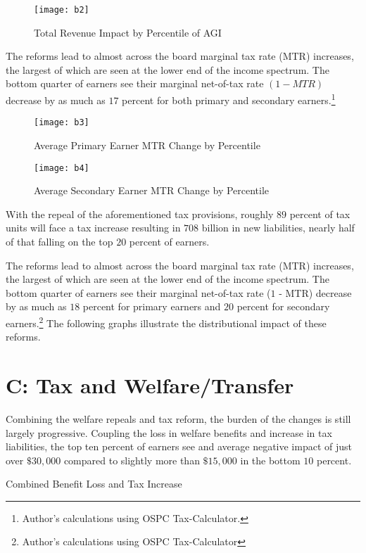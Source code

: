 \documentclass{article}
\begin{document}
\begin{figure}[H]
\centering
\caption{Total Revenue Impact by Percentile of AGI}
\texttt{[image: b2]}
\end{figure}

The reforms lead to almost across the board marginal tax rate (MTR) increases, the largest of which are seen at the lower end of the income spectrum. The bottom quarter of earners see their marginal net-of-tax rate $(1 - MTR)$ decrease by as much as $17$ percent for both primary and secondary earners.\footnote{Author’s calculations using OSPC Tax-Calculator.}


\begin{figure}[H]
\centering
\caption{Average Primary Earner MTR Change by Percentile}
\texttt{[image: b3]}
\end{figure}

\begin{figure}[H]
\centering
\caption{Average Secondary Earner MTR Change by Percentile}
\texttt{[image: b4]}
\end{figure}

With the repeal of the aforementioned tax provisions, roughly $89$ percent of tax units will face a tax increase resulting in $708$ billion in new liabilities, nearly half of that falling on the top $20$ percent of earners.

The reforms lead to almost across the board marginal tax rate (MTR) increases, the largest of which are seen at the lower end of the income spectrum. The bottom quarter of earners see their marginal net-of-tax rate ($1$ - MTR) decrease by as much as $18$ percent for primary earners and $20$ percent for secondary earners.\footnote{Author's calculations using OSPC Tax-Calculator} The following graphs illustrate the distributional impact of these reforms.

\section{C: Tax and Welfare/Transfer}
Combining the welfare repeals and tax reform, the burden of the changes is still largely progressive. Coupling the loss in welfare benefits and increase in tax liabilities, the top ten percent of earners see and average negative impact of just over $\$30,000$ compared to slightly more than $\$15,000$ in the bottom $10$ percent.

\begin{table}[H]
\caption{Combined Benefit Loss and Tax Increase}

\begin{center}
\begin{adjustbox}{max width=\textwidth}

\end{adjustbox}
\end{center}
\end{table}
\end{document}
